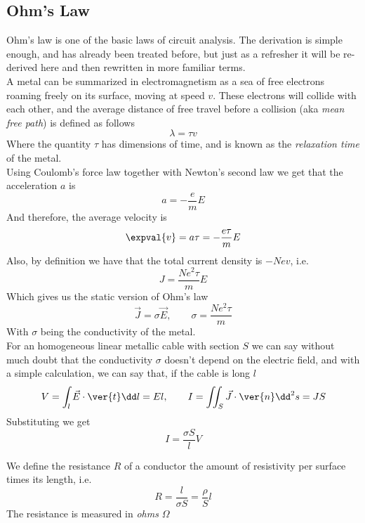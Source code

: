 \documentclass[../electromagnetism.tex]{subfiles}
\begin{document}
\subsection{Ohm's Law}
Ohm's law is one of the basic laws of circuit analysis. The derivation is simple enough, and has already been treated before, but just as a refresher it will be re-derived here and then rewritten in more familiar terms.\\
A metal can be summarized in electromagnetism as a sea of free electrons roaming freely on its surface, moving at speed $v$. These electrons will collide with each other, and the average distance of free travel before a collision (aka \textit{mean free path}) is defined as follows
\begin{equation*}
	\lambda=\tau v
\end{equation*}
Where the quantity $\tau$ has dimensions of time, and is known as the \textit{relaxation time} of the metal.\\
Using Coulomb's force law together with Newton's second law we get that the acceleration $a$ is 
\begin{equation*}
	a=-\frac{e}{m}E
\end{equation*}
And therefore, the average velocity is
\begin{equation*}
	\expval{v}=a\tau=-\frac{e\tau}{m}E
\end{equation*}
Also, by definition we have that the total current density is $-Nev$, i.e. 
\begin{equation*}
	J=\frac{Ne^2\tau}{m}E
\end{equation*}
Which gives us the static version of Ohm's law
\begin{equation}
	\vec{J}=\sigma\vec{E}, \qquad \sigma=\frac{Ne^2\tau}{m}
	\label{ohm1.dc}
\end{equation}
With $\sigma$ being the conductivity of the metal.\\
For an homogeneous linear metallic cable with section $S$ we can say without much doubt that the conductivity $\sigma$ doesn't depend on the electric field, and with a simple calculation, we can say that, if the cable is long $l$
\begin{equation*}
	V=\int_l\vec{E}\cdot\ver{t}\dd l=El, \qquad I=\iint_S\vec{J}\cdot\ver{n}\dd^2s=JS
\end{equation*}
Substituting we get
\begin{equation*}
	I=\frac{\sigma S}{l}V
\end{equation*}
\begin{dfn}[Resistance]
	We define the resistance $R$ of a conductor the amount of resistivity per surface times its length, i.e.
	\begin{equation*}
		R=\frac{l}{\sigma S}=\frac{\rho}{S}l
	\end{equation*}
	The resistance is measured in \textit{ohms} $\Omega$
\end{dfn}
\end{document}
